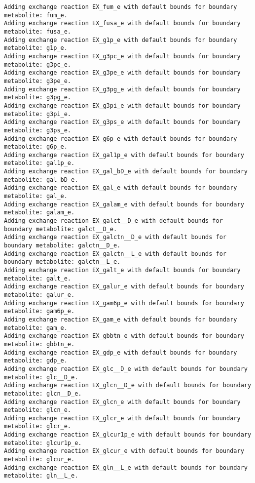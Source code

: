 \documentclass[
  letterpaper,
  DIV=11,
  numbers=noendperiod]{scrartcl}
\begin{document}
\begin{verbatim}
Adding exchange reaction EX_fum_e with default bounds for boundary metabolite: fum_e.
Adding exchange reaction EX_fusa_e with default bounds for boundary metabolite: fusa_e.
Adding exchange reaction EX_g1p_e with default bounds for boundary metabolite: g1p_e.
Adding exchange reaction EX_g3pc_e with default bounds for boundary metabolite: g3pc_e.
Adding exchange reaction EX_g3pe_e with default bounds for boundary metabolite: g3pe_e.
Adding exchange reaction EX_g3pg_e with default bounds for boundary metabolite: g3pg_e.
Adding exchange reaction EX_g3pi_e with default bounds for boundary metabolite: g3pi_e.
Adding exchange reaction EX_g3ps_e with default bounds for boundary metabolite: g3ps_e.
Adding exchange reaction EX_g6p_e with default bounds for boundary metabolite: g6p_e.
Adding exchange reaction EX_gal1p_e with default bounds for boundary metabolite: gal1p_e.
Adding exchange reaction EX_gal_bD_e with default bounds for boundary metabolite: gal_bD_e.
Adding exchange reaction EX_gal_e with default bounds for boundary metabolite: gal_e.
Adding exchange reaction EX_galam_e with default bounds for boundary metabolite: galam_e.
Adding exchange reaction EX_galct__D_e with default bounds for boundary metabolite: galct__D_e.
Adding exchange reaction EX_galctn__D_e with default bounds for boundary metabolite: galctn__D_e.
Adding exchange reaction EX_galctn__L_e with default bounds for boundary metabolite: galctn__L_e.
Adding exchange reaction EX_galt_e with default bounds for boundary metabolite: galt_e.
Adding exchange reaction EX_galur_e with default bounds for boundary metabolite: galur_e.
Adding exchange reaction EX_gam6p_e with default bounds for boundary metabolite: gam6p_e.
Adding exchange reaction EX_gam_e with default bounds for boundary metabolite: gam_e.
Adding exchange reaction EX_gbbtn_e with default bounds for boundary metabolite: gbbtn_e.
Adding exchange reaction EX_gdp_e with default bounds for boundary metabolite: gdp_e.
Adding exchange reaction EX_glc__D_e with default bounds for boundary metabolite: glc__D_e.
Adding exchange reaction EX_glcn__D_e with default bounds for boundary metabolite: glcn__D_e.
Adding exchange reaction EX_glcn_e with default bounds for boundary metabolite: glcn_e.
Adding exchange reaction EX_glcr_e with default bounds for boundary metabolite: glcr_e.
Adding exchange reaction EX_glcur1p_e with default bounds for boundary metabolite: glcur1p_e.
Adding exchange reaction EX_glcur_e with default bounds for boundary metabolite: glcur_e.
Adding exchange reaction EX_gln__L_e with default bounds for boundary metabolite: gln__L_e.

\end{verbatim}
\end{document}
